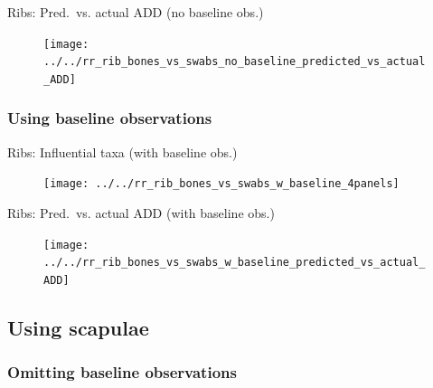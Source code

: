 \documentclass{beamer}
\begin{document}
\begin{frame}{Ribs: Pred.\ vs. actual ADD (no baseline obs.)}

  \begin{center}
    \begin{figure}
      \texttt{[image: ../../rr\_rib\_bones\_vs\_swabs\_no\_baseline\_predicted\_vs\_actual\_ADD]}
    \end{figure}
  \end{center}

\end{frame}


\subsubsection[With baseline]{Using baseline observations}

\begin{frame}{Ribs: Influential taxa (with baseline obs.)}

  \begin{center}
    \begin{figure}
      \texttt{[image: ../../rr\_rib\_bones\_vs\_swabs\_w\_baseline\_4panels]}
    \end{figure}
  \end{center}

\end{frame}


\begin{frame}{Ribs: Pred.\ vs. actual ADD (with baseline obs.)}

  \begin{center}
    \begin{figure}
      \texttt{[image: ../../rr\_rib\_bones\_vs\_swabs\_w\_baseline\_predicted\_vs\_actual\_ADD]}
    \end{figure}
  \end{center}

\end{frame}



\subsection[Scapulae]{Using scapulae}

\subsubsection[No baseline]{Omitting baseline observations}
\end{document}
